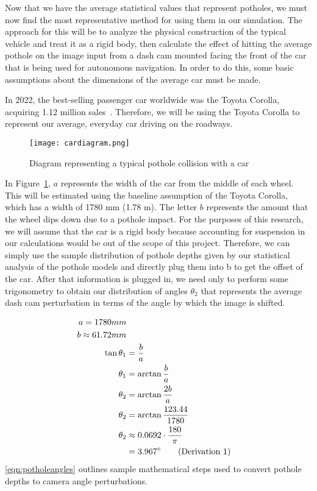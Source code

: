 \documentclass{article}
\begin{document}
Now that we have the average statistical values that represent potholes, we must now find the most representative method for using them in our simulation. The approach for this will be to analyze the physical construction of the typical vehicle and treat it as a rigid body, then calculate the effect of hitting the average pothole on the image input from a dash cam mounted facing the front of the car that is being used for autonomous navigation. In order to do this, some basic assumptions about the dimensions of the average car must be made.

In 2022, the best-selling passenger car worldwide was the Toyota Corolla, acquiring 1.12 million sales~\cite{carstats}. Therefore, we will be using the Toyota Corolla to represent our average, everyday car driving on the roadways. 

\begin{figure}[h!]
    \centering
    \texttt{[image: cardiagram.png]}
    \caption{Diagram representing a typical pothole collision with a car \cite{cardiagram}}
    \label{fig:cardiagram}
\end{figure}

In Figure~\ref{fig:cardiagram}, $a$ represents the width of the car from the middle of each wheel. This will be estimated using the baseline assumption of the Toyota Corolla, which has a width of 1780 mm (1.78 m). The letter $b$ represents the amount that the wheel dips down due to a pothole impact. For the purposes of this research, we will assume that the car is a rigid body because accounting for suspension in our calculations would be out of the scope of this project. Therefore, we can simply use the sample distribution of pothole depths given by our statistical analysis of the pothole models and directly plug them into b to get the offset of the car. After that information is plugged in, we need only to perform some trigonometry to obtain our distribution of angles $\theta_2$ that represents the average dash cam perturbation in terms of the angle by which the image is shifted.

\begin{align*}
\label{eqn:potholeangles}
    a = 1780 mm \\
    b \approx 61.72 mm \\
    \tan\theta_1&= \frac{b}{a} \\
    \theta_1&= \arctan\frac{b}{a} \\
    \theta_2&= \arctan\frac{2b}{a} \\
    \theta_2&= \arctan\frac{123.44}{1780} \\
    \theta_2&\approx 0.0692 \cdot \frac{180}{\pi} \\
    &= 3.967\degree
\tag{Derivation 1}
\end{align*}
\ref{eqn:potholeangles} outlines sample mathematical steps used to convert pothole depths to camera angle perturbations.
\end{document}

